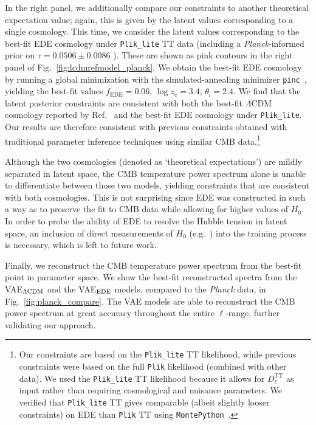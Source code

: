 \documentclass[aps, prd, reprint, superscriptaddress, nofootinbib, bibnotes]{revtex4-2}
\newcommand{\Planck}{\textit{Planck}}
\begin{document}
In the right panel, we additionally compare our constraints to another theoretical expectation value; again, this is given by the latent values corresponding to a single cosmology. This time, we consider the latent values corresponding to the best-fit EDE cosmology under \texttt{Plik\_lite} TT data (including a \Planck-informed prior on $\tau = 0.0506 \pm 0.0086$ \cite{Planck:2018vyg}). These are shown as pink contours in the right panel of Fig.~\ref{fig:lcdmrefmodel_planck}.
We obtain the best-fit EDE cosmology by running a global minimization with the simulated-annealing minimizer \texttt{pinc}~\cite{Herold:2024enb}, yielding the best-fit values $f_\mathrm{EDE}=0.06$, $\log z_\mathrm{c} = 3.4$, $\theta_\mathrm{i} = 2.4$. We find that the latent posterior constraints are consistent with both the best-fit $\Lambda$CDM cosmology reported by Ref.~\cite{Planck:2018vyg} and the best-fit EDE cosmology under \texttt{Plik\_lite}. Our results are therefore consistent with previous constraints obtained with traditional parameter inference techniques using similar CMB data.\footnote{Our constraints are based on the \texttt{Plik\_lite} TT likelihood, while previous constraints were based on the full \texttt{Plik} likelihood (combined with other data). We used the \texttt{Plik\_lite} TT likelihood because it allows for $D_\ell^\mathrm{TT}$ as input rather than requiring cosmological and nuisance parameters. We verified that \texttt{Plik\_lite} TT gives comparable (albeit slightly looser constraints) on EDE than \texttt{Plik} TT using \texttt{MontePython}~\cite{Audren:2012wb, Brinckmann:2018cvx}.}

Although the two cosmologies (denoted as `theoretical expectations') are mildly separated in latent space, the CMB temperature power spectrum alone is unable to differentiate between those two models, yielding constraints that are consistent with both cosmologies. This is not surprising since EDE was constructed in such a way as to preserve the fit to CMB data while allowing for higher values of $H_0$. In order to probe the ability of EDE to resolve the Hubble tension in latent space, an inclusion of direct measurements of $H_0$ (e.g.\ \cite{Breuval:2024lsv, Murakami:2023xuy, Freedman:2024eph, TDCOSMO:2023hni, Vogl:2024bum}) into the training process is necessary, which is left to future work.

Finally, we reconstruct the CMB temperature power spectrum from the best-fit point in parameter space. We show the best-fit reconstructed spectra from the VAE$_{\Lambda \rm{CDM}}$ and the VAE$_{\rm{EDE}}$ models, compared to the \Planck{} data, in Fig.~\ref{fig:planck_compare}. The VAE models are able to reconstruct the CMB power spectrum at great accuracy throughout the entire $\ell$-range, further validating our approach.
\end{document}
